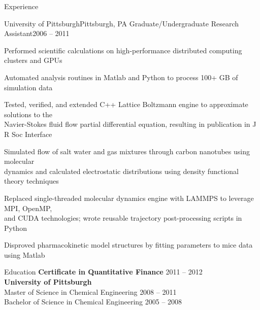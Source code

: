 \documentclass{resume}
\begin{document}
\begin{rSection}{Experience}

\begin{rSubsection}{University of Pittsburgh}{Pittsburgh, PA}
{Graduate\slash Undergraduate Research Assistant}{2006 -- 2011}
\item Performed scientific calculations on high-performance distributed
computing clusters and GPUs
\item Automated analysis routines in Matlab and Python
to process 100+ GB of simulation data
\item Tested, verified, and extended C++ Lattice Boltzmann engine to
approximate solutions to the \\ Navier-Stokes fluid flow partial
differential equation, resulting in publication in J R Soc Interface
\item Simulated flow of salt water and gas mixtures
through carbon nanotubes using molecular \\ dynamics and calculated
electrostatic distributions using density functional theory techniques
\item Replaced single-threaded molecular dynamics engine with LAMMPS
to leverage MPI, OpenMP, \\ and CUDA technologies;
wrote reusable trajectory post-processing scripts in Python
\item Disproved pharmacokinetic model structures by fitting
parameters to mice data using Matlab
\end{rSubsection}


\end{rSection}


\begin{rSection}{Education}
{\bf Certificate in Quantitative Finance} \hfill {2011 -- 2012} \\
{\bf University of Pittsburgh} \\ 
Master of Science in Chemical Engineering \hfill {2008 -- 2011} \\
Bachelor of Science in Chemical Engineering \hfill {2005 -- 2008}
\end{rSection}
\end{document}
